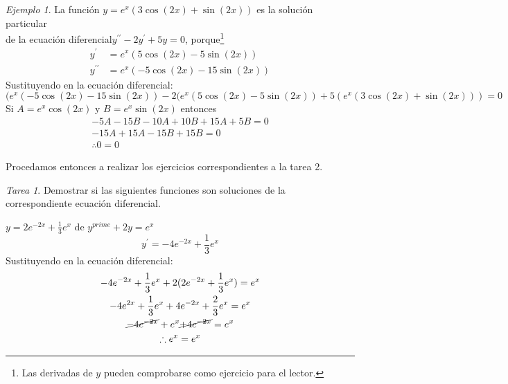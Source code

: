 \documentclass[12pt]{article} %
\theoremstyle{remark} %
\newtheorem{tarea}{Tarea}[section] %
\newtheorem{ejemplo}{Ejemplo}[section]
\newcommand{\ed}{ecuación diferencial}
\begin{document}
\begin{ejemplo}
  La función $y = e^x (3 \cos (2x) + \sin (2x))$ es la solución particular \\
  de la \ed $y^{\prime \prime} - 2y^{\prime} + 5y = 0$, 
  porque\footnote{Las derivadas de $y$ pueden comprobarse como ejercicio para el lector.}
  \begin{align*}
    y^{\prime} &= e^x (5 \cos (2x) - 5 \sin (2x)) \\
    y^{\prime \prime} &= e^x (-5 \cos (2x) - 15 \sin (2x))
  \end{align*}
  Sustituyendo en la \ed :
  \[(e^x(-5 \cos (2x) -15 \sin (2x)) - 2(e^x(5 \cos (2x) -5 \sin (2x)) 
  +5(e^x(3 \cos (2x) + \sin (2x))) = 0\]
  Si $A = e^x \cos(2x)$ y $B = e^x \sin(2x)$ entonces
  \begin{gather*}
    -5A - 15B -10A + 10B +15A + 5B = 0\\
    -15A + 15A -15B + 15 B = 0\\
    \therefore 0 = 0
  \end{gather*}
\end{ejemplo}

Procedamos entonces a realizar los ejercicios correspondientes a la tarea 2.

\begin{tarea}
  Demostrar si las siguientes funciones son soluciones de la correspondiente ecuación diferencial.
  \begin{ejercicios}
  \item $y = 2e^{-2x} + \frac{1}{3} e^x$ de $y^{prime} + 2y = e^x$
    \[ y^{\prime} = -4e^{-2x} + \frac{1}{3} e^x \]
    Sustituyendo en la \ed:
    \begin{gather*}
      -4e^{-2x} + \frac{1}{3} e^x + 2(2e^{-2x} + \frac{1}{3} e^x) = e^x\\
      -4e^{2x} + \frac{1}{3} e^x + 4e^{-2x} + \frac{2}{3} e^x = e^x\\
      \cancel{-4e^{-2x}} + e^x \cancel{+ 4e^{-2x}} = e^x\\
      \therefore e^x = e^x
    \end{gather*}
  \end{ejercicios}
\end{tarea}
\end{document}
